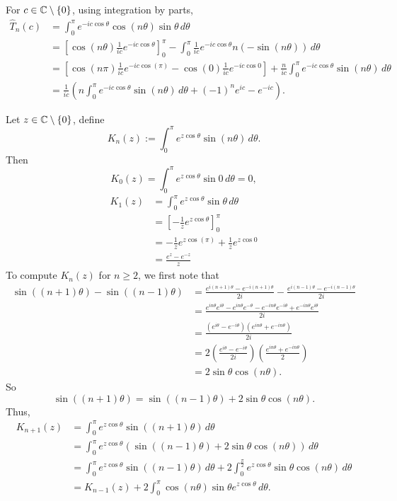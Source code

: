 \documentclass[12pt, oneside, a4paper]{article}
\begin{document}
For $c\in\mathbb C\setminus\{0\}$, using integration by parts,
\begin{align*}
    \hat{T}_n(c) &= \int_0^\pi e^{-ic\cos\theta}\cos(n\theta)\sin\theta\,d\theta\\
    &= \left[\cos(n\theta)\frac{1}{ic}e^{-ic\cos\theta}\right]_0^{\pi} - \int_0^{\pi}\frac{1}{ic}e^{-ic\cos\theta}n(-\sin(n\theta))\,d\theta\\
    &= \left[\cos(n\pi)\frac{1}{ic}e^{-ic\cos(\pi)} - \cos(0)\frac{1}{ic}e^{-ic\cos 0}\right] + \frac{n}{ic}\int_0^{\pi}e^{-ic\cos\theta}\sin(n\theta)\,d\theta\\
    &= \frac{1}{ic}\left(n\int_0^{\pi}e^{-ic\cos\theta}\sin(n\theta)\,d\theta + (-1)^n e^{ic}- e^{-ic}\right).
\end{align*}

Let $z\in \mathbb C\setminus\{0\}$, define 
\[K_n(z):=\int_0^\pi e^{z\cos\theta}\sin(n\theta)\,d\theta.\]
Then
$$K_0(z) = \int_0^{\pi}e^{z\cos\theta}\sin 0\,d\theta=0,$$
\begin{align*}
K_1(z) &= \int_0^{\pi}e^{z\cos\theta}\sin\theta\,d\theta\\
&= \left[-\frac{1}{z}e^{z\cos\theta}\right]_0^{\pi}\\
&= -\frac{1}{z}e^{z\cos(\pi)} + \frac{1}{z}e^{z\cos 0}\\
&= \frac{e^z - e^{-z}}{z}
\end{align*}
To compute $K_n(z)$ for $n\geq 2$, we first note that
\begin{align*}
\sin((n+1)\theta) - \sin((n-1)\theta) &= \frac{e^{i(n+1)\theta} - e^{-i(n+1)\theta}}{2i} - \frac{e^{i(n-1)\theta} - e^{-i(n-1)\theta}}{2i}\\
&= \frac{e^{in\theta}e^{i\theta} - e^{in\theta}e^{-\theta} - e^{-in\theta}e^{-i\theta} + e^{-in\theta}e^{i\theta}}{2i}\\
&= \frac{(e^{i\theta}-e^{-i\theta})(e^{in\theta}+e^{-in\theta})}{2i}\\
&= 2\left(\frac{e^{i\theta}-e^{-i\theta}}{2i}\right)\left(\frac{e^{in\theta}+e^{-in\theta}}{2}\right)\\
&= 2\sin\theta\cos(n\theta).
\end{align*}
So
$$\sin((n+1)\theta) = \sin((n-1)\theta) + 2\sin\theta\cos(n\theta).$$
Thus,
\begin{align*}
K_{n+1}(z) &= \int_0^{\pi}e^{z\cos\theta}\sin((n+1)\theta)\,d\theta\\
&= \int_0^{\pi}e^{z\cos\theta}(\sin((n-1)\theta) + 2\sin\theta\cos(n\theta))\,d\theta\\
&= \int_0^{\pi}e^{z\cos\theta}\sin((n-1)\theta)\,d\theta + 2\int_0^{\frac{\pi}{2}}e^{z\cos\theta}\sin\theta\cos(n\theta)\,d\theta\\
&= K_{n-1}(z) + 2\int_0^{\pi}\cos(n\theta)\sin\theta e^{z\cos\theta}\,d\theta.
\end{align*}
\end{document}
